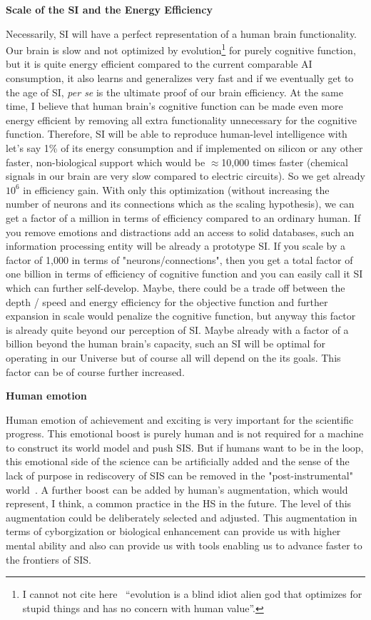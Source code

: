 \documentclass[a4paper,11pt]{article}
\begin{document}
\textbf{Scale of the SI and the Energy Efficiency}

Necessarily, SI will have a perfect representation of a human brain functionality. Our brain is slow and not optimized by evolution\footnote{I cannot not cite here~\textcite{Scott2014Moloch} ``evolution is a blind idiot alien god that optimizes for stupid things and has no concern with human value''.} for purely cognitive function, but it is quite energy efficient compared to the current comparable AI consumption, it also learns and generalizes very fast and if we eventually get to the age of SI, \emph{per se} is the ultimate proof of our brain efficiency. At the same time, I believe that human brain's cognitive function can be made even more energy efficient by removing all extra functionality unnecessary for the cognitive function. Therefore, SI will be able to reproduce human-level intelligence with let's say 1\% of its energy consumption and if implemented on silicon or any other faster, non-biological support which would be $\approx$10,000 times faster (chemical signals in our brain are very slow compared to electric circuits). So we get already $10^6$ in efficiency gain.
With only this optimization (without increasing the number of neurons and its connections which as the scaling hypothesis), we can get a factor of a million in terms of efficiency compared to an ordinary human. If you remove emotions and distractions add an access to solid databases, such an information processing entity will be already a prototype SI. If you scale by a factor of 1,000 in terms of "neurons/connections", then you get a total factor of one billion in terms of efficiency of cognitive function and you can easily call it SI which can further self-develop. Maybe, there could be a trade off between the depth / speed and energy efficiency for the objective function and further expansion in scale would penalize the cognitive function, but anyway this factor is already quite beyond our perception of SI. Maybe already with a factor of a billion beyond the human brain's capacity, such an SI will be optimal for operating in our Universe but of course all will depend on the its goals. This factor can be of course further increased.

\textbf{Human emotion}

Human emotion of achievement and exciting is very important for the scientific progress. This emotional boost is purely human and is not required for a machine to construct its world model and push SIS. But if humans want to be in the loop, this emotional side of the science can be artificially added and the sense of the lack of purpose in rediscovery of SIS can be removed in the "post-instrumental" world~\parencite{DeepUtopia}. A further boost can be added by human's augmentation, which would represent, I think, a common practice in the HS in the future. The level of this augmentation could be deliberately selected and adjusted. This augmentation in terms of cyborgization or biological enhancement can provide us with higher mental ability and also can provide us with tools enabling us to advance faster to the frontiers of SIS.
\end{document}
